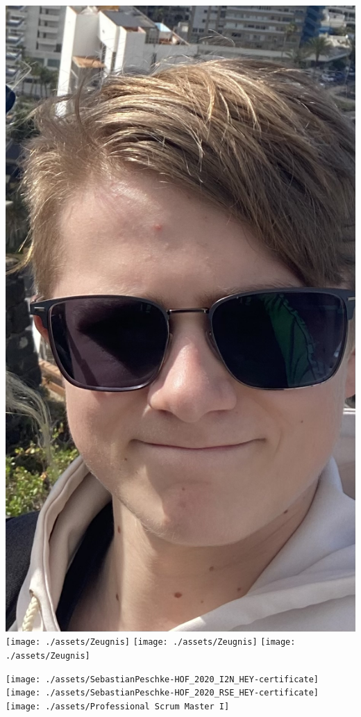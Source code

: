 \documentclass[
	10pt, %
]{FreemanCV}
\begin{document}
\newpage
\includegraphics[page=1,scale=0.1]{./assets/Rill-Malte}
\newpage
\texttt{[image: ./assets/Zeugnis]}
\newpage
\texttt{[image: ./assets/Zeugnis]}
\newpage
\texttt{[image: ./assets/Zeugnis]}

\begin{landscape}
	\texttt{[image: ./assets/SebastianPeschke-HOF\_2020\_I2N\_HEY-certificate]}
	\newpage
	\texttt{[image: ./assets/SebastianPeschke-HOF\_2020\_RSE\_HEY-certificate]}
	\newpage
	\texttt{[image: ./assets/Professional Scrum Master I]}
\end{landscape}
\end{document}
